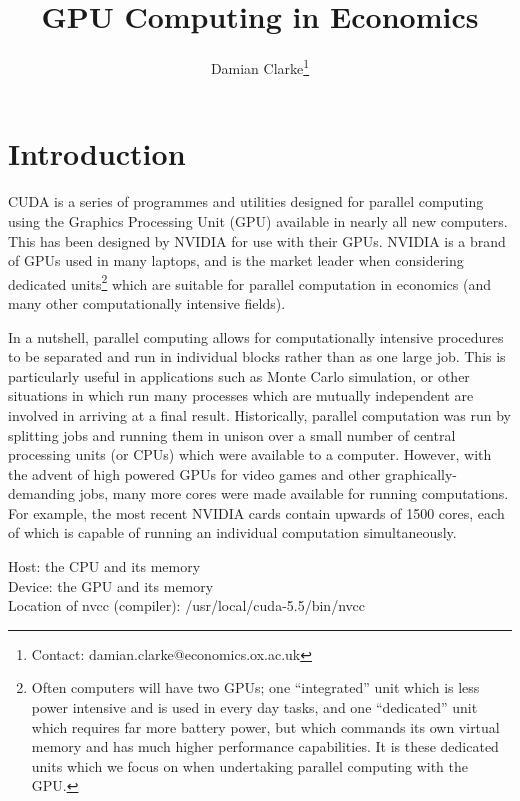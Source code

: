 \documentclass[a4paper,10pt]{article}
\title{GPU Computing in Economics}
\author{Damian Clarke\thanks{Contact: damian.clarke@economics.ox.ac.uk}}
\begin{document}
\maketitle

\section{Introduction}
CUDA is a series of programmes and utilities designed for parallel computing 
using the Graphics Processing Unit (GPU) available in nearly all new computers.
This has been designed by NVIDIA for use with their GPUs.  NVIDIA is a brand of
GPUs used in many laptops, and is the market leader when considering dedicated 
units\footnote{Often computers will have two GPUs; one ``integrated'' unit 
which is less power intensive and is used in every day tasks, and one 
``dedicated'' unit which requires far more battery power, but which commands
its own virtual memory and has much higher performance capabilities.  It is 
these dedicated units which we focus on when undertaking parallel computing 
with the GPU.} which are suitable for parallel computation in economics (and
many other computationally intensive fields).

In a nutshell, parallel computing allows for computationally intensive 
procedures to be separated and run in individual blocks rather than as one 
large job.  This is particularly useful in applications such as Monte Carlo
simulation, or other situations in which run many processes which are mutually
independent are involved in arriving at a final result.  Historically, parallel
computation was run by splitting jobs and running them in unison over a small
number of central processing units (or CPUs) which were available to a 
computer.  However, with the advent of high powered GPUs for video games and
other graphically-demanding jobs, many more cores were made available for 
running computations.  For example, the most recent NVIDIA cards contain
upwards of 1500 cores, each of which is capable of running an individual 
computation simultaneously.


Host: the CPU and its memory \\
Device: the GPU and its memory\\

Location of nvcc (compiler): /usr/local/cuda-5.5/bin/nvcc
\appendix
\end{document}
